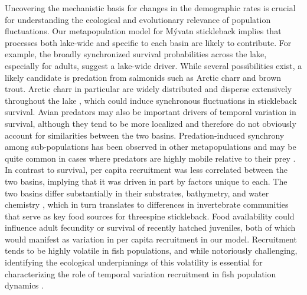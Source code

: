 \documentclass[11pt]{article}
\begin{document}
Uncovering the mechanistic basis for changes in the demographic rates 
is crucial for understanding the ecological and evolutionary relevance 
of population fluctuations. 
Our metapopulation model for M\'{y}vatn stickleback implies that processes both lake-wide 
and specific to each basin are likely to contribute. 
For example, the broadly synchronized survival probabilities across the lake, 
especially for adults, suggest a lake-wide driver. 
While several possibilities exist, 
a likely candidate is predation from salmonids such as Arctic charr and brown trout. 
Arctic charr in particular are widely distributed and disperse extensively 
throughout the lake \citep{gudbergsson1991,gudbergsson2004}, 
which could induce synchronous fluctuations in stickleback survival. 
Avian predators may also be important drivers of temporal variation in survival, 
although they tend to be more localized \citep{einarsson2004myvatn}
and therefore do not obviously account for similarities between the two basins. 
Predation-induced synchrony among sub-populations has been observed in other metapopulations 
and may be quite common in cases where predators are highly mobile relative to their prey 
\citep{ims2000, gilg2009}. 
In contrast to survival, 
per capita recruitment was less correlated between the two basins, 
implying that it was driven in part by factors unique to each. 
The two basins differ substantially in their substrates, bathymetry, and water chemistry 
\citep{einarsson2004myvatn}, 
which in turn translates to differences 
in invertebrate communities \citep{bartrons2015spatial} 
that serve as key food sources for threespine stickleback. 
Food availability could influence adult fecundity or survival 
of recently hatched juveniles, 
both of which would manifest as variation in per capita recruitment in our model. 
Recruitment tends to be highly volatile in fish populations, 
and while notoriously challenging, 
identifying the ecological underpinnings of this volatility is essential 
for characterizing the role 
of temporal variation recruitment in fish population dynamics 
\citep{dixon1999episodic, ludsin2014physical}.
\end{document}
